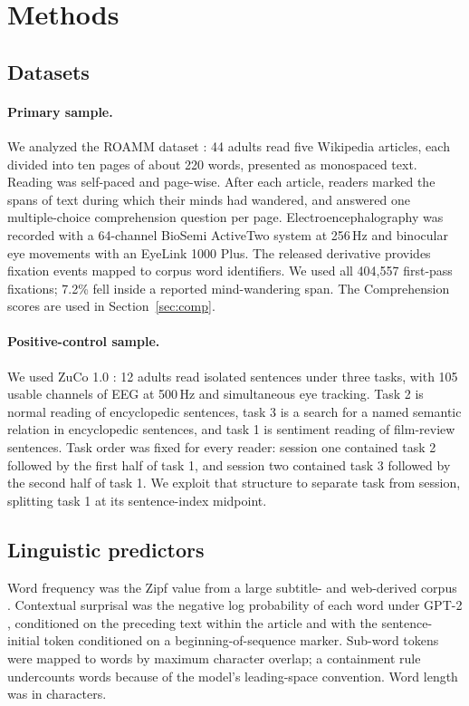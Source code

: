 \documentclass[11pt]{article}
\begin{document}
\section{Methods}

\subsection{Datasets}

\paragraph{Primary sample.} We analyzed the ROAMM dataset \citep{roammdata}: 44 adults read
five Wikipedia articles, each divided into ten pages of about 220 words, presented as
monospaced text. Reading was self-paced and page-wise. After each article, readers marked the
spans of text during which their minds had wandered, and answered one multiple-choice
comprehension question per page. Electroencephalography was recorded with a 64-channel
BioSemi ActiveTwo system at 256\,Hz and binocular eye movements with an EyeLink 1000 Plus.
The released derivative provides fixation events mapped to corpus word identifiers. We used
all 404{,}557 first-pass fixations; 7.2\% fell inside a reported mind-wandering span. The
Comprehension scores are used in Section~\ref{sec:comp}.

\paragraph{Positive-control sample.} We used ZuCo 1.0 \citep{hollenstein2018}: 12 adults read
isolated sentences under three tasks, with 105 usable channels of EEG at 500\,Hz and
simultaneous eye tracking. Task 2 is normal reading of encyclopedic sentences, task 3 is a
search for a named semantic relation in encyclopedic sentences, and task 1 is sentiment
reading of film-review sentences. Task order was fixed for every reader: session one contained
task 2 followed by the first half of task 1, and session two contained task 3 followed by the
second half of task 1. We exploit that structure to separate task from session, splitting task
1 at its sentence-index midpoint.

\subsection{Linguistic predictors}

Word frequency was the Zipf value from a large subtitle- and web-derived corpus
\citep{vanheuven2014,brysbaert2018}. Contextual surprisal was the negative log probability of
each word under GPT-2 \citep{radford2019}, conditioned on the preceding text within the
article and with the sentence-initial token conditioned on a beginning-of-sequence marker.
Sub-word tokens were mapped to words by maximum character overlap; a containment rule
undercounts words because of the model's leading-space convention. Word length was in
characters.
\end{document}
